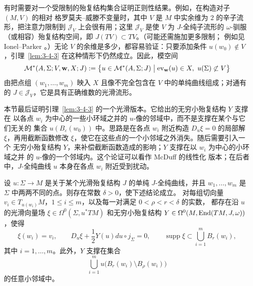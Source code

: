 \begin{remark}\label{rem:3-4-5}
有时需要对一个受限制的殆复结构集合证明正则性结果。例如，在构造对子 $(M,V)$ 的相对
格罗莫夫--威滕不变量时，其中 $V$ 是 $M$ 中实余维为 $2$ 的辛子流形，把注意力限制到
$\mathcal J_V$ 上会很有用；这里 $\mathcal J_V$ 是使 $V$ 为 $J$-全纯子流形的
$\omega$-驯服（或相容）殆复结构空间，即 $J(TV)\subset TV$。（可能还需施加更多限制；
例如见 Ionel--Parker 。）无论 $V$ 的余维是多少，都容易验证：只要添加条件
$u(w_0)\notin V$，引理~\ref{lem:3-4-3} 在这种情形下仍然成立。因此，模空间
\[
  \mathcal M^*(A,\Sigma;V,\mathbf w,X;J)
  :=\bigl\{u\in\mathcal M^*(A,\Sigma;J)
  \bigm|\operatorname{ev}_{\mathbf w}(u)\in X,\ u(\Sigma)\not\subset V\bigr\}
\]
由把点组 $(w_1,\ldots,w_m)$ 映入 $X$ 且像不完全包含在 $V$ 中的单纯曲线组成；对通有的
$J\in\mathcal J_V$，它是具有正确维数的光滑流形。
\end{remark}

本节最后证明引理~\ref{lem:3-4-3} 的一个光滑版本。它给出的无穷小殆复结构 $Y$ 支撑在
以各点 $w_i$ 为中心的一些小环域之并的 $u$-像的邻域中，而不是支撑在某个与它们无关的
集合 $u(B_\varepsilon(w_0))$ 中。思路是在各点 $w_i$ 附近构造 $D_u\xi=0$ 的局部解
$\xi$，再用截断函数修改 $\xi$，使它在这些点的一个小邻域之外消失。随后需要引入一个
无穷小殆复结构 $Y$，来补偿截断函数造成的影响；$Y$ 支撑在以 $w_i$ 为中心的小环域之并
的 $u$-像的一个邻域内。这个论证可以看作 McDuff  的线性化
版本；在后者中，$J$-全纯曲线 $u$ 本身在各点 $w_i$ 附近受到扰动。

\begin{lemma}\label{lem:3-4-6}
设 $u:\Sigma\to M$ 是关于某个光滑殆复结构 $J$ 的单纯 $J$-全纯曲线，并且
$w_1,\ldots,w_m$ 是 $\Sigma$ 中两两不同的点。则存在常数 $\delta>0$，使下述结论成立。
对每组切向量
$v_i\in T_{u(w_i)}M$，$1\le i\le m$，以及每一对满足 $0<\rho<r<\delta$ 的实数，
都存在沿 $u$ 的光滑向量场 $\xi\in\Omega^0(\Sigma,u^*TM)$ 和无穷小殆复结构
$Y\in\Omega^0(M,\operatorname{End}(TM,J,\omega))$，使得
\[
  \xi(w_i)=v_i,\qquad
  D_u\xi+\frac12Y(u)du\circ j_\Sigma=0,\qquad
  \operatorname{supp}\xi\subset\bigcup_{i=1}^mB_r(w_i),
\]
其中 $i=1,\ldots,m$。此外，$Y$ 支撑在集合
\[
  \bigcup_{i=1}^m u\bigl(B_r(w_i)\setminus B_\rho(w_i)\bigr)
\]
的任意小邻域中。
\end{lemma}

